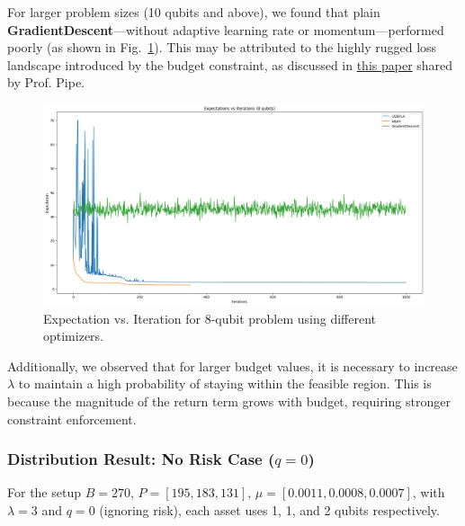 For larger problem sizes (10 qubits and above), we found that plain \textbf{GradientDescent}—without adaptive learning rate or momentum—performed poorly (as shown in Fig.~\ref{fig:optimizer_comparison}). This may be attributed to the highly rugged loss landscape introduced by the budget constraint, as discussed in \href{https://www.mdpi.com/1999-4893/15/6/202#:~:text=,%2C%20for%C2%A0almost%20all}{this paper} shared by Prof. Pipe.

\vspace{1em}

\begin{figure}[h]
    \includegraphics[width=\textwidth]{figures/report_1/optimizer_comparison.png}
    \caption{Expectation vs. Iteration for 8-qubit problem using different optimizers.}
    \label{fig:optimizer_comparison}
\end{figure}


Additionally, we observed that for larger budget values, it is necessary to increase \( \lambda \) to maintain a high probability of staying within the feasible region. This is because the magnitude of the return term grows with budget, requiring stronger constraint enforcement.

\vspace{1em}
\subsubsection*{Distribution Result: No Risk Case (\( q = 0 \))}

For the setup \( B = 270 \), \( P = [195, 183, 131] \), \( \mu = [0.0011, 0.0008, 0.0007] \), with \( \lambda = 3 \) and \( q = 0 \) (ignoring risk), each asset uses 1, 1, and 2 qubits respectively.

